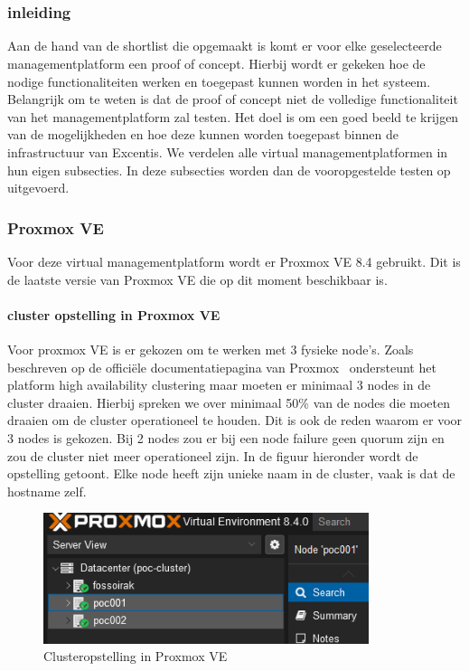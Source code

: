 
\chapter{}%
\label{ch:poc}

\subsection{inleiding}

Aan de hand van de shortlist die opgemaakt is komt er voor elke geselecteerde managementplatform een proof of concept. Hierbij wordt er gekeken hoe de nodige functionaliteiten werken en toegepast kunnen worden in het systeem.
Belangrijk om te weten is dat de proof of concept niet de volledige functionaliteit van het managementplatform zal testen. Het doel is om een goed beeld te krijgen van de mogelijkheden en hoe deze kunnen worden toegepast binnen de infrastructuur van Excentis. 
We verdelen alle virtual managementplatformen in hun eigen subsecties. In deze subsecties worden dan de vooropgestelde testen op uitgevoerd.
\subsection{Proxmox VE}

Voor deze virtual managementplatform wordt er Proxmox VE 8.4 gebruikt. Dit is de laatste versie van Proxmox VE die op dit moment beschikbaar is.
\subsubsection{cluster opstelling in Proxmox VE}
Voor proxmox VE is er gekozen om te werken met 3 fysieke node's. Zoals beschreven op de officiële documentatiepagina van Proxmox~\cite{proxmoxHA} ondersteunt het platform high availability clustering maar moeten er minimaal 3 nodes in de cluster draaien.
Hierbij spreken we over minimaal 50\% van de nodes die moeten draaien om de cluster operationeel te houden. Dit is ook de reden waarom er voor 3 nodes is gekozen. Bij 2 nodes zou er bij een node failure geen quorum zijn en zou de cluster niet meer operationeel zijn.
In de figuur hieronder wordt de opstelling getoont. Elke node heeft zijn unieke naam in de cluster, vaak is dat de hostname zelf.
\begin{figure}[H]
  \centering
  \includegraphics[width=0.85\textwidth]{../poc/cluster-info-prox.png}
  \caption{Clusteropstelling in Proxmox VE}
  \label{fig:cluster-proxmox}
\end{figure}
